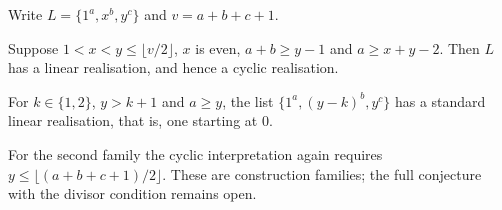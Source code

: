 Write $L=\{1^a,x^b,y^c\}$ and $v=a+b+c+1$.

\begin{theorem}\label{thm:ao24}
Suppose $1<x<y\leq\lfloor v/2\rfloor$, $x$ is even, $a+b\geq y-1$ and $a\geq x+y-2$. Then $L$ has a linear realisation, and hence a cyclic realisation.
\end{theorem}

\begin{theorem}\label{thm:ao25}
For $k\in\{1,2\}$, $y>k+1$ and $a\geq y$, the list $\{1^a,(y-k)^b,y^c\}$ has a standard linear realisation, that is, one starting at $0$.
\end{theorem}

For the second family the cyclic interpretation again requires $y\leq\lfloor(a+b+c+1)/2\rfloor$. These are construction families; the full conjecture with the divisor condition remains open.
